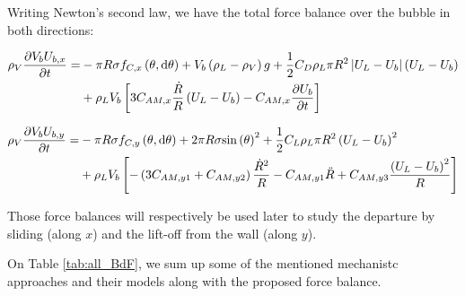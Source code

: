 Writing Newton's second law, we have the total force balance over the bubble in both directions:

\begin{align}
\nonumber \rho_{V} \dtime{V_{b}U_{b,x}} = & -\pi R \sigma f_{C,x}\parth{\theta, \dtheta} + V_{b}\parth{\rho_{L}-\rho_{V}}g + \frac{1}{2}C_{D}\rho_{L}\pi R^{2} \bars{U_{L}-U_{b}}\parth{U_{L}-U_{b}}\\
%
& + \rho_{L}V_{b}\crocht{3C_{AM,x}\frac{\dot{R}}{R}\parth{U_{L}-U_{b}} - C_{AM,x} \dtime{U_{b}}}
\label{eq:bdf_x}
\end{align}

\begin{align}
\nonumber \rho_{V} \dtime{V_{b}U_{b,y}} = & -\pi R \sigma f_{C,y}\parth{\theta, \dtheta} + 2\pi R \sigma \sin{\theta}^{2} + \frac{1}{2}C_{L}\rho_{L}\pi R^{2} \parth{U_{L}-U_{b}}^{2}\\
%
& + \rho_{L}V_{b}\crocht{-\parth{3 C_{AM,y1} + C_{AM,y2}}\frac{\dot{R}^{2}}{R}-C_{AM,y1}\ddot{R} + C_{AM,y3}\frac{\parth{U_{L}-U_{b}}^{2}}{R}}
\label{eq:bdf_y}
\end{align}

Those force balances will respectively be used later to study the departure by sliding (along $x$) and the lift-off from the wall (along $y$).

\npar

On Table \ref{tab:all_BdF}, we sum up some of the mentioned mechanistc approaches and their models along with the proposed force balance.



